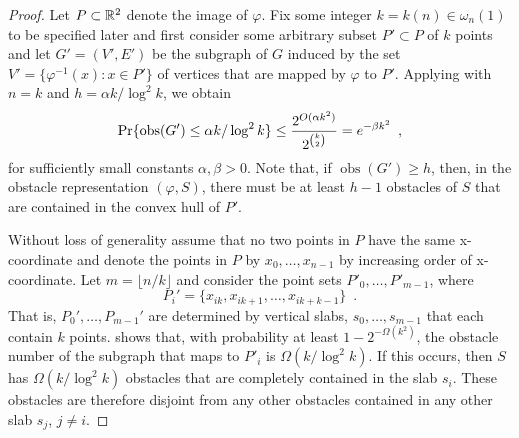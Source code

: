 \documentclass{patmorin}
\DeclareMathOperator{\obs}{obs}
\begin{document}
\begin{proof}
Let $P\subset\mathbb{R}^2$ denote the image of $\varphi$.  Fix some integer $k=k(n)\in\omega_n(1)$ to be
specified later and first consider some arbitrary subset $P'\subset P$
of $k$ points and let $G'=(V',E')$ be the subgraph of $G$ induced by
the set $V'=\{\varphi^{-1}(x):x\in P'\}$ of vertices that are mapped by
$\varphi$ to $P'$.  Applying  with $n=k$ and $h=\alpha
k/\log^2 k$, we obtain
\begin{equation}
     \Pr\{\obs(G') \le \alpha k/\log^2 k\} 
       \le \frac{2^{O(\alpha k^2)}}{2^{\binom{k}{2}}}
       = e^{-\beta k^2} \enspace , \eqlabel{g1}
\end{equation}
%
for sufficiently small constants $\alpha,\beta > 0$.
Note that, if $\obs(G')\ge h$, then, in the obstacle representation
$(\varphi,S)$, there must be at least $h-1$ obstacles of $S$ that are
contained in the convex hull of $P'$.

Without loss of generality assume that no two points in $P$ have the
same x-coordinate and denote the points in $P$ by $x_0,\ldots,x_{n-1}$
by increasing order of x-coordinate.  Let $m=\lfloor n/k\rfloor$ and
consider the point sets $P'_0,\ldots,P'_{m-1}$, where
\[ 
  P_i'=\{x_{ik},x_{ik+1},\ldots,x_{ik+k-1}\} \enspace .
\]  
That is, $P_0',\ldots,P_{m-1}'$ are determined by vertical slabs,
$s_0,\ldots,s_{m-1}$ that each contain $k$ points.   shows
that, with probability at least $1-2^{-\Omega(k^2)}$, the obstacle number
of the subgraph that maps to $P'_i$ is $\Omega(k/\log^2 k)$.  If this
occurs, then $S$ has $\Omega(k/\log^2 k)$ obstacles that are completely
contained in the slab $s_i$.  These obstacles are therefore disjoint
from any other obstacles contained in any other slab $s_j$, $j\neq i$.


\end{proof}
\end{document}
